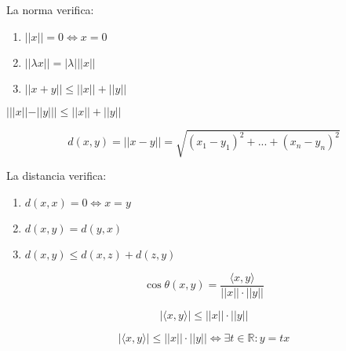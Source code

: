 \begin{prop}{}
La norma verifica:

\begin{enumerate}[label=(\roman*)]
    \item $||x||=0 \Leftrightarrow x = 0$
    \item $||\lambda x|| = |\lambda| ||x||$
    \item $|| x + y|| \leq ||x|| + ||y||$
\end{enumerate}
\end{prop}

\begin{obs}
$|||x|| - ||y||| \leq ||x|| + ||y||$
\end{obs}

\begin{defn}{}
\[ d(x,y) = ||x - y|| = \sqrt{(x_1 - y_1)^2 + ... + (x_n - y_n)^2}\]
\end{defn}

\begin{prop}{}
La distancia verifica:
\begin{enumerate}[label=(\roman*)]
    \item $d(x,x)=0 \Leftrightarrow x=y$
    \item $d(x,y) = d(y,x)$
    \item $d(x,y) \leq d(x,z) + d(z,y)$
\end{enumerate}
\end{prop}

\begin{defn}{}
\[ \cos\theta(x,y) = \frac{\langle x{,}y\rangle}{||x|| \cdot ||y||}  \]
\end{defn}

\begin{theo}{}
\[ |\langle x{,}y\rangle| \leq ||x|| \cdot ||y|| \]
\end{theo}

\begin{prop}{}
\[ |\langle x{,}y\rangle| \leq ||x|| \cdot ||y|| \Leftrightarrow \exists t \in \mathbb{R}: y = tx \]
\end{prop}
